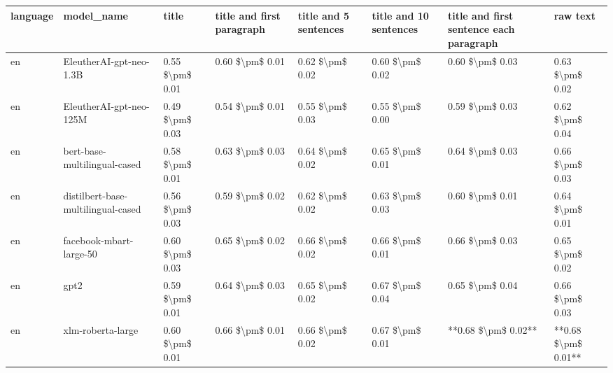 \begin{tabular}{llllllll}
\toprule
language &                         model\_name &           title & title and first paragraph & title and 5 sentences & title and 10 sentences & title and first sentence each paragraph &            raw text \\
\midrule
      en &            EleutherAI-gpt-neo-1.3B & 0.55 \$\textbackslash pm\$ 0.01 &           0.60 \$\textbackslash pm\$ 0.01 &       0.62 \$\textbackslash pm\$ 0.02 &        0.60 \$\textbackslash pm\$ 0.02 &                         0.60 \$\textbackslash pm\$ 0.03 &     0.63 \$\textbackslash pm\$ 0.02 \\
      en &            EleutherAI-gpt-neo-125M & 0.49 \$\textbackslash pm\$ 0.03 &           0.54 \$\textbackslash pm\$ 0.01 &       0.55 \$\textbackslash pm\$ 0.03 &        0.55 \$\textbackslash pm\$ 0.00 &                         0.59 \$\textbackslash pm\$ 0.03 &     0.62 \$\textbackslash pm\$ 0.04 \\
      en &       bert-base-multilingual-cased & 0.58 \$\textbackslash pm\$ 0.01 &           0.63 \$\textbackslash pm\$ 0.03 &       0.64 \$\textbackslash pm\$ 0.02 &        0.65 \$\textbackslash pm\$ 0.01 &                         0.64 \$\textbackslash pm\$ 0.03 &     0.66 \$\textbackslash pm\$ 0.03 \\
      en & distilbert-base-multilingual-cased & 0.56 \$\textbackslash pm\$ 0.03 &           0.59 \$\textbackslash pm\$ 0.02 &       0.62 \$\textbackslash pm\$ 0.02 &        0.63 \$\textbackslash pm\$ 0.03 &                         0.60 \$\textbackslash pm\$ 0.01 &     0.64 \$\textbackslash pm\$ 0.01 \\
      en &            facebook-mbart-large-50 & 0.60 \$\textbackslash pm\$ 0.03 &           0.65 \$\textbackslash pm\$ 0.02 &       0.66 \$\textbackslash pm\$ 0.02 &        0.66 \$\textbackslash pm\$ 0.01 &                         0.66 \$\textbackslash pm\$ 0.03 &     0.65 \$\textbackslash pm\$ 0.02 \\
      en &                               gpt2 & 0.59 \$\textbackslash pm\$ 0.01 &           0.64 \$\textbackslash pm\$ 0.03 &       0.65 \$\textbackslash pm\$ 0.02 &        0.67 \$\textbackslash pm\$ 0.04 &                         0.65 \$\textbackslash pm\$ 0.04 &     0.66 \$\textbackslash pm\$ 0.03 \\
      en &                  xlm-roberta-large & 0.60 \$\textbackslash pm\$ 0.01 &           0.66 \$\textbackslash pm\$ 0.01 &       0.66 \$\textbackslash pm\$ 0.02 &        0.67 \$\textbackslash pm\$ 0.01 &                     **0.68 \$\textbackslash pm\$ 0.02** & **0.68 \$\textbackslash pm\$ 0.01** \\

\end{tabular}
